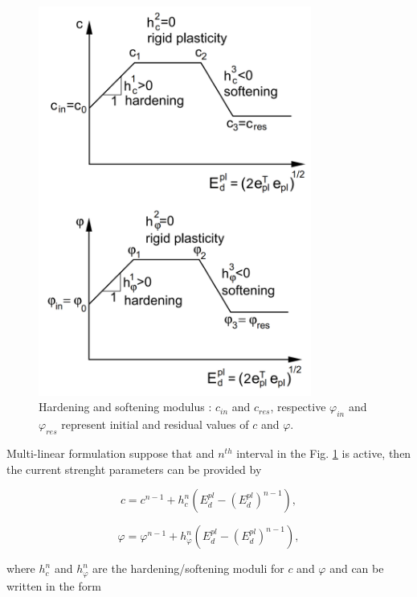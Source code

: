 \begin{figure}[h!]
	\centering	
	\includegraphics[width=0.8\textwidth, angle=0]{obrazky/hardening_softening_modulus.png}
	\caption[Hardening and softening modulus]{Hardening and softening modulus \cite{geofem}: $c_{in}$ and $c_{res}$, respective $\varphi_{in}$ and $\varphi_{res}$ represent initial and residual values of $c$ and $\varphi$.} \label{obr:H}
\end{figure}
 
Multi-linear formulation suppose that and $n^{th}$ interval in the Fig. \ref{obr:H} is active, then the current strenght parameters can be provided by

\begin{equation}\label{eq:c}
	c = c^{n-1} + h_c^n \left( E_d^{pl} -(E_d^{pl})^{n-1} \right),
\end{equation}

\begin{equation}\label{eq:phi}
\varphi = \varphi^{n-1} + h_\varphi^n\left( E_d^{pl} - (E_d^{pl})^{n-1} \right),
\end{equation}

where $h_c^n$ and $h_\varphi^n$ are the hardening/softening moduli for $c$ and $\varphi$ and can be written in the form


